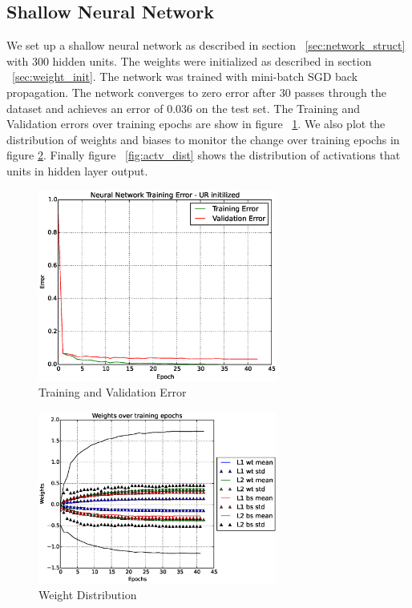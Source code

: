 \documentclass[Proceedings]{ascelike}
\begin{document}
\subsection{Shallow Neural Network}
We set up a shallow neural network as described in section ~\ref{sec:network_struct} with $300$ hidden units. The weights were initialized as described in section ~\ref{sec:weight_init}. The network was trained with mini-batch SGD back propagation. The network converges to zero error after $30$ passes through the dataset and achieves an error of $0.036$ on the test set. The Training and Validation errors over training epochs are show in figure ~\ref{fig:sn_test_err}. We also plot the distribution of weights and biases to  monitor the change over training epochs in figure \ref{fig:wt_dist}. Finally figure ~\ref{fig:actv_dist} shows the distribution of activations that units in hidden layer output. 


\begin{figure}[H]
  \caption{Training and Validation Error}
  \label{fig:sn_test_err}
  \centering
  \includegraphics[width=0.7\textwidth, keepaspectratio]{shallownet_perf.eps}
\end{figure}

\begin{figure}[H]
  \caption{Weight Distribution}
  \label{fig:wt_dist}
  \centering
  \includegraphics[width=0.7\textwidth, keepaspectratio]{shallownet_weights.eps}
\end{figure}
\end{document}
